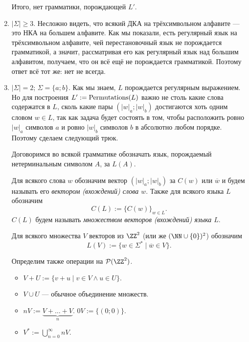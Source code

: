 \documentclass[12pt,a4paper]{article}
\begin{document}
\begin{problem}{8}
\begin{enumerate}
                Итого, нет грамматики, порождающей $L'$.

            \item $|\Sigma| \geqslant 3$. Несложно видеть, что всякий ДКА на трёхсимвольном алфавите --- это НКА на большем алфавите. Как мы показали, есть регулярный язык на трёхсимвольном алфавите, чей перестановочный язык не порождается грамматикой, а значит, рассматривая его как регулярный язык над большим алфавитом, получаем, что он всё ещё не порождается грамматикой. Поэтому ответ всё тот же: нет не всегда.

            \item $|\Sigma| = 2$; $\Sigma = \{a; b\}$. Как мы знаем, $L$ порождается регулярным выражением. Но для построения $L' := \mathrm{Permutations}(L)$ важно не столь какие слова содержатся в $L$, сколь какие пары $(|w|_a; |w|_b)$ достигаются хоть одним словом $w \in L$, так как задача будет состоять в том, чтобы расположить ровно $|w|_a$ символов $a$ и ровно $|w|_b$ символов $b$ в абсолютно любом порядке. Поэтому сделаем следующий трюк.
            
                Договоримся во всякой грамматике обозначать язык, порождаемый нетерминальным символом $A$, за $L(A)$.
            
                \begin{definition}
                    Для всякого слова $w$ обозначим вектор $(|w|_a; |w|_b)$ за $C(w)$ или $\overline{w}$ и будем называть его \emph{вектором (вхождений) слова $w$}. Также для всякого языка $L$ обозначим
                    \[C(L) := \{C(w)\}_{w \in L}.\]
                    $C(L)$ будем называть \emph{множеством векторов (вхождений) языка $L$}.
                    
                    Для всякого множества $V$ векторов из $\ZZ^2$ (или же $(\NN \cup \{0\})^2$) обозначим
                    \[L(V) := \{w \in \Sigma^* \mid \overline{w} \in V\}.\]

                    Определим также операции на $\mathcal{P}(\ZZ^2)$.
                    \begin{itemize}
                        \item $V + U := \{v + u \mid v \in V \wedge u \in U\}$.
                        \item $V \cup U$ --- обычное объединение множеств.
                        \item $nV := \underbrace{V + \dots + V}_{n}$. $0V := \{(0; 0)\}$.
                        \item $V^* := \bigcup_{n=0}^\infty nV$.
                    \end{itemize}


\end{definition}
\end{enumerate}
\end{problem}
\end{document}
